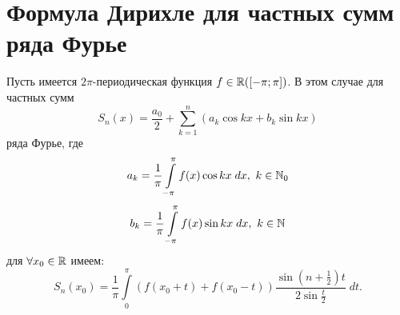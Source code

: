 \documentclass[../../main.tex]{subfiles}
\begin{document}
\section{Формула Дирихле для частных сумм ряда Фурье}
\begin{thm}
	Пусть имеется $2\pi$-периодическая функция $f \in \mathbb{R}([-\pi;\pi])$. В этом случае для частных сумм
	\begin{equation}
		\label{18:1}
		S_n(x) = \dfrac{a_0}{2} + \sum_{k=1}^{n}(a_k\cos{kx} + b_k\sin{kx})
	\end{equation} 
	ряда Фурье, где
	\begin{equation}
		\label{18:2}
		a_k = \dfrac{1}{\pi}\int\limits_{-\pi}^{\pi}{f(x)\cos{kx}\; dx},\ k \in \mathbb{N}_0
	\end{equation}
	\begin{equation}
		\label{18:3}
		b_k = \dfrac{1}{\pi}\int\limits_{-\pi}^{\pi}{f(x)\sin{kx}\; dx},\ k \in \mathbb{N}
	\end{equation}
	для $\forall x_0 \in \mathbb{R}$ имеем:
	\begin{equation}
		\label{18:4}
		S_n(x_0)=\dfrac{1}{\pi}\int\limits_{0}^{\pi}({f(x_0 + t) + f(x_0 - t)})
		\dfrac{\sin(n + \frac{1}{2})t}{2\sin{\frac{t}{2}}}\; dt.
	\end{equation}
\end{thm}
\end{document}
